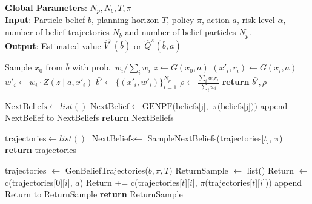 \documentclass[acmlarge, manuscript, screen, review, natbib=false, oneside]{acmart}
\begin{document}
\begin{algorithm*}[tb]
	\caption{CVaR Value Function Estimation for Policy $\pi$}
	\label{alg:value_func_eval}
	\textbf{Global Parameters}: $N_p, N_b, T, \pi$\\
	\textbf{Input}: Particle belief $\bar{b}$, planning horizon $T$, policy $\pi$, action $a$, risk level $\alpha$, number of belief trajectories $N_b$ and number of belief particles $N_p$.\\
	\textbf{Output}: Estimated value $\hat{V}^\pi(\bar{b})$ or $\hat{Q}^\pi(\bar{b},a)$

	\vspace{4pt}
	\noindent
	\begin{minipage}[t]{0.48\textwidth}
	\begin{algorithmic}[1]
		\State Sample $x_0$ from $\bar{b}$ with prob.\ $w_i / \sum_i w_i$
		\State $z \gets G(x_0,a)$
		\State $(x'_i, r_i) \gets G(x_i,a)$
		\State $w'_i \gets w_i \cdot Z(z \mid a, x'_i)$
		\EndFor
		\State $\bar{b'} \gets \{(x'_i,w'_i)\}_{i=1}^{N_p}$
		\State $\rho \gets \frac{\sum_i w_i r_i}{\sum_i w_i}$
		\State \textbf{return} $\bar{b'}, \rho$
		\EndProcedure

		\State $\text{NextBeliefs} \gets list()$
		\State $\text{NextBelief}\gets \text{GENPF(beliefs[j]},$ $\pi\text{(beliefs[j]))}$
		\State append NextBelief to NextBeliefs
		\EndFor
		\State \textbf{return} NextBeliefs
		\EndProcedure

		\State $\text{trajectories} \gets list()$
		\State {}
		\EndFor
		\State $\text{NextBeliefs} \gets$ SampleNextBeliefs(trajectories[$t$], $\pi$)
		\State {}
		\EndFor
		\State \textbf{return} trajectories
		\EndProcedure
	\end{algorithmic}
	\end{minipage}%
	\hfill
	\begin{minipage}[t]{0.48\textwidth}
	\begin{algorithmic}[1]
		\State trajectories $\gets$ GenBeliefTrajectories($\bar{b}, \pi, T$)
		\State ReturnSample $\gets$ list()
		\State Return $\gets$ c(trajectories[0][$i$], $a$)
		\State Return += c(trajectories[$t$][$i$], $\pi$(trajectories[$t$][$i$]))
		\EndFor
		\State append Return to ReturnSample
		\EndFor
		\State \textbf{return} ReturnSample
		\EndProcedure


\end{algorithmic}
\end{minipage}
\end{algorithm*}
\end{document}
